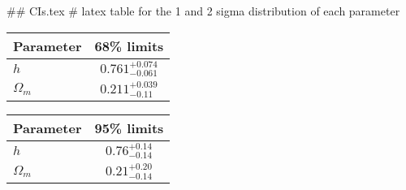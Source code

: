 ## CIs.tex
# latex table for the 1 and 2 sigma distribution of each parameter

\begin{tabular} { l  c}
 Parameter &  68\% limits\\
\hline
{\boldmath$h              $} & $0.761^{+0.074}_{-0.061}   $\\
{\boldmath$\Omega_m       $} & $0.211^{+0.039}_{-0.11}    $\\
\hline
\end{tabular}

\begin{tabular} { l  c}
 Parameter &  95\% limits\\
\hline
{\boldmath$h              $} & $0.76^{+0.14}_{-0.14}      $\\
{\boldmath$\Omega_m       $} & $0.21^{+0.20}_{-0.14}      $\\
\hline
\end{tabular}
